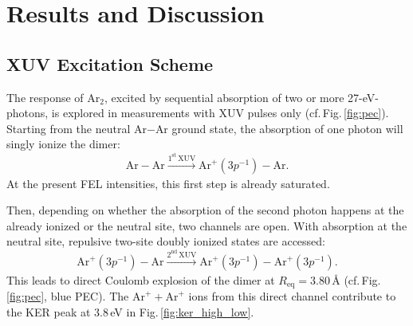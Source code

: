 \documentclass[%
 aip,
rsi,%
 amsmath,amssymb,
preprint,%
]{revtex4-1}
\begin{document}



\section{Results and Discussion}
 \label{sec:results}
 
\subsection{XUV Excitation Scheme} 
 \label{sec:xuv_only}

The response of Ar$_2$, excited by sequential absorption of two or more 27-eV-photons, is explored in measurements with XUV pulses only (cf.\,Fig.\,\ref{fig:pec}). Starting from the neutral Ar$-$Ar ground state, the absorption of one photon will singly ionize the dimer:
%
	\begin{equation}
	\mathrm{Ar}-\mathrm{Ar} \xrightarrow[]{1^{\text{st}}\,\text{XUV}} \mathrm{Ar}^+(3p^{-1})-\mathrm{Ar}.
	\end{equation}
%
At the present FEL intensities, this first step is already saturated. 

Then, depending on whether the absorption of the second photon happens at the already ionized or the neutral site, two channels are open.  With absorption at the neutral site, repulsive two-site doubly ionized states are accessed:
%
	\begin{equation}
	\mathrm{Ar}^+(3p^{-1})-\mathrm{Ar} \xrightarrow[]{2^\text{nd}\,\text{XUV}} \mathrm{Ar}^+(3p^{-1})-\mathrm{Ar}^+(3p^{-1}). 
	\end{equation}
%
This leads to direct Coulomb explosion of the dimer at $R_{\mathrm{eq}} = 3.80\,\text{\AA}$ \cite{Stoychev2008} (cf.\,Fig.\,\ref{fig:pec}, blue PEC). The $\mathrm{Ar}^+ + \mathrm{Ar}^+$ ions from this direct channel contribute to the KER peak at 3.8\,eV in Fig.\,\ref{fig:ker_high_low}. 
\end{document}
